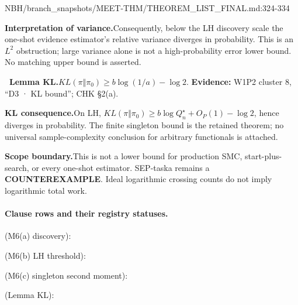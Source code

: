 \begin{stmt}{NBH/branch_snapshots/MEET-THM/THEOREM_LIST_FINAL.md:324-334}
\par\smallskip\noindent\textbf{Interpretation of variance.}\enspace Consequently, below the LH discovery scale the one-shot evidence estimator’s relative variance diverges in probability. This is an \(L^2\) obstruction; large variance alone is not a high-probability error lower bound. No matching upper bound is asserted.
\par\smallskip\noindent\textbf{\ Lemma KL.}\enspace \(KL(\pi\Vert\pi_0)\ge b\log(1/a)-\log2\). \textbf{Evidence:} W1P2 cluster 8, “D3 · KL bound”; CHK §2(a).
\par\smallskip\noindent\textbf{KL consequence.}\enspace On LH, \(KL(\pi\Vert\pi_0)\ge b\log Q_n^\star+O_P(1)-\log2\), hence diverges in probability. The finite singleton bound is the retained theorem; no universal sample-complexity conclusion for arbitrary functionals is attached.
\par\smallskip\noindent\textbf{Scope boundary.}\enspace This is not a lower bound for production SMC, start-plus-search, or every one-shot estimator. SEP-taska remains a \textbf{COUNTEREXAMPLE}. Ideal logarithmic crossing counts do not imply logarithmic total work.
\end{stmt}

\paragraph{Clause rows and their registry statuses.}
{\small
\par\noindent{} (M6(a) discovery): 
\par\noindent{} (M6(b) LH threshold): 
\par\noindent{} (M6(c) singleton second moment): 
\par\noindent{} (Lemma KL): 
\par}

